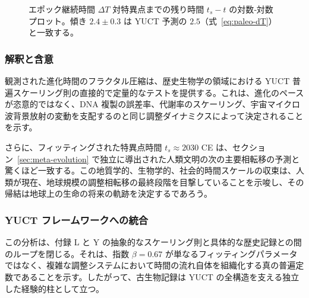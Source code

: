 \documentclass[12pt,a4paper]{article}
\theoremstyle{remark}
\begin{document}
	\begin{figure}[htbp]
		\centering
		\caption{エポック継続時間 \(\Delta T\) 対特異点までの残り時間 \(t_s - t\) の対数‐対数プロット。傾き \(2.4 \pm 0.3\) は YUCT 予測の \(2.5\)（式~\eqref{eq:paleo-dT}）と一致する。}
		\label{fig:paleo-scaling}
	\end{figure}
	
	\subsubsection{解釈と含意}
	
	観測された進化時間のフラクタル圧縮は、歴史生物学の領域における YUCT 普遍スケーリング則の直接的で定量的なテストを提供する。これは、進化のペースが恣意的ではなく、DNA 複製の誤差率、代謝率のスケーリング、宇宙マイクロ波背景放射の変動を支配するのと同じ調整ダイナミクスによって決定されることを示す。
	
	さらに、フィッティングされた特異点時間 \(t_s \approx 2030\) CE は、セクション~\ref{sec:meta-evolution} で独立に導出された人類文明の次の主要相転移の予測と驚くほど一致する。この地質学的、生物学的、社会的時間スケールの収束は、人類が現在、地球規模の調整相転移の最終段階を目撃していることを示唆し、その帰結は地球上の生命の将来の軌跡を決定するであろう。
	
	\subsubsection{YUCT フレームワークへの統合}
	
	この分析は、付録 L と Y の抽象的なスケーリング則と具体的な歴史記録との間のループを閉じる。それは、指数 \(\beta = 0.67\) が単なるフィッティングパラメータではなく、複雑な調整システムにおいて時間の流れ自体を組織化する真の普遍定数であることを示す。したがって、古生物記録は YUCT の全構造を支える独立した経験的柱として立つ。
	
\end{document}
